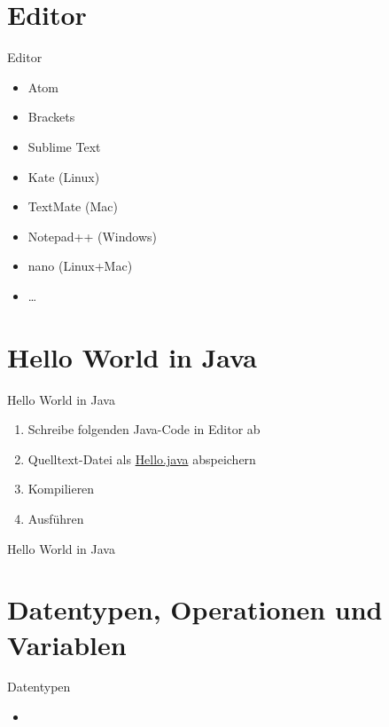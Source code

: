 \documentclass[18pt]{beamer}
\begin{document}
\section{Editor}

\begin{frame}{Editor}
    \begin{itemize}
        \item Atom
        \item Brackets
        \item Sublime Text
        \item Kate (Linux)
        \item TextMate (Mac)
        \item Notepad++ (Windows)
        \item nano (Linux+Mac)
        \item \dots
    \end{itemize}
\end{frame}

\section{Hello World in Java}

\begin{frame}{Hello World in Java}
    \begin{enumerate}
        \item Schreibe folgenden Java-Code in Editor ab
        \item Quelltext-Datei als \url{Hello.java} abspeichern
        \item Kompilieren
        \item Ausführen
    \end{enumerate}
\end{frame}

\begin{frame}{Hello World in Java}
    
\end{frame}

\section{Datentypen, Operationen und Variablen}

\begin{frame}{Datentypen}
    \begin{itemize}
        \item
    \end{itemize}
\end{frame}
\end{document}
